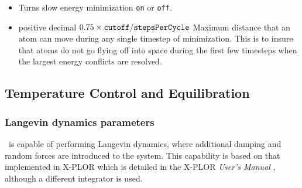 \begin{itemize}

\item
{}
{Turns slow energy minimization {\tt on} or {\tt off}.}

\item
{}
{positive decimal}
{$0.75\times\mbox{{\tt cutoff}}/\mbox{{\tt stepsPerCycle}}$}
{Maximum distance that an atom can move during any single timestep of
minimization.  This is to insure that atoms do not go flying off into
space during the first few timesteps when the largest energy conflicts
are resolved.}

\end{itemize}

\subsection{Temperature Control and Equilibration}

\subsubsection{Langevin dynamics parameters}

\PDAC\ is capable
of performing Langevin dynamics, where additional damping and
random forces are introduced to the system.  This capability
is based on that implemented in X-PLOR which is detailed
in the X-PLOR {\it User's Manual} ,
although a different integrator is used.

